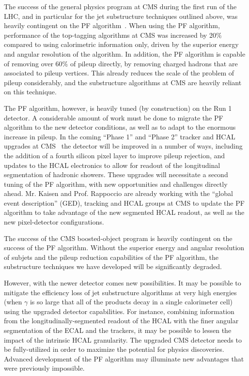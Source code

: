 \documentclass[12pt]{proposalnsf}
\begin{document}
The success of the general physics program at CMS during
the first run of the LHC, and in particular for the jet substructure
techniques outlined above, was heavily contingent on the
PF algorithm~\cite{particleflow}. 
When using the PF algorithm, performance of the top-tagging
algorithms at CMS was increased by 20\% compared to using calorimetric
information only, driven by the superior energy
and angular resolution of the algorithm. In addition, the PF algorithm
is capable of removing
over 60\% of pileup directly, by removing charged hadrons that are
associated to pileup vertices. This already reduces the scale of the
problem of pileup considerably, and the substructure algorithms at CMS
are heavily reliant on this technique. 

The PF algorithm, however, is heavily tuned (by construction) on the
Run 1 detector. A considerable amount of work must be done to migrate
the PF algorithm to the new detector conditions, as well as to adapt
to the enormous increase in pileup.
In the coming ``Phase 1'' and ``Phase 2''
tracker and HCAL upgrades at CMS~\cite{Dominguez:1481838,Mans:1481837}
the detector will be improved in a number of ways, including the
addition of a fourth silicon pixel layer to improve pileup
rejection, and
updates to the HCAL electronics to allow for readout of the
longitudinal segmentation of hadronic showers. These upgrades will
necessitate a second tuning of the PF
algorithm, with new opportunities and challenges directly
ahead. Mr. Kaisen and Prof. Rappoccio are already working with the
``global event description'' (GED), tracking and HCAL groups at CMS to
update the PF algorithm to take advantage of the new segmented HCAL
readout, as well as the new pixel-detector configurations. 

The success of the CMS boosted-object program is heavily
contingent on the success of the PF algorithm. Without the superior
energy and angular resolution of subjets and the pileup
reduction capabilities of the PF algorithm, the substructure
techniques we have developed will be significantly degraded.

However, with the newer detector comes new possibilities. It may be
possible to mitigate the efficiency loss of jet substructure
algorithms at very high energies (when $\gamma$ is so large that all of
the products decay in a single calorimeter cell) using the upgraded
detector capabilities. For instance, combining information from the
longitudinally-segmented
readout of the HCAL with the finer angular segmentation of the ECAL
and the trackers,
it may be possible to lessen the impact of the intrinsic
HCAL granularity. 
The upgraded CMS detector needs to be fully-utilized in order to
maximize the potential for physics discoveries. Advanced development
of the PF algorithm may illuminate new advantages that were
previously impossible.
\end{document}
